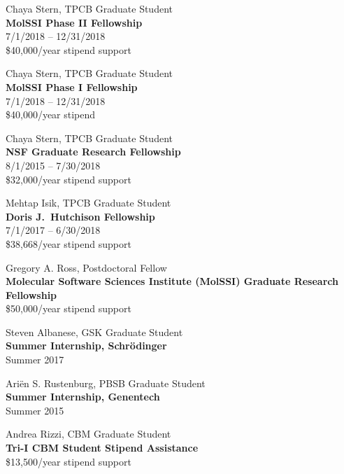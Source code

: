 \documentclass[10pt]{article}
\begin{document}
Chaya Stern, TPCB Graduate Student\\
{\bf MolSSI Phase II Fellowship}\\
7/1/2018 -- 12/31/2018\\
\$40,000/year stipend support

\vspace{1.5ex}

Chaya Stern, TPCB Graduate Student\\
{\bf MolSSI Phase I Fellowship}\\
7/1/2018 -- 12/31/2018\\
\$40,000/year stipend

\vspace{1.5ex}	

Chaya Stern, TPCB Graduate Student\\
{\bf NSF Graduate Research Fellowship}\\
8/1/2015 -- 7/30/2018\\
\$32,000/year stipend support

\vspace{1.5ex}

Mehtap Isik, TPCB Graduate Student\\
{\bf Doris J.~Hutchison Fellowship}\\
7/1/2017 -- 6/30/2018\\
\$38,668/year stipend support

\vspace{1.5ex}

Gregory A. Ross, Postdoctoral Fellow\\
{\bf Molecular Software Sciences Institute (MolSSI) Graduate Research Fellowship}\\
\$50,000/year stipend support

\vspace{1.5ex}

Steven Albanese, GSK Graduate Student\\
{\bf Summer Internship, Schr\"{o}dinger}\\
Summer 2017

\vspace{1.5ex}

Ari\"{e}n S. Rustenburg, PBSB Graduate Student\\
{\bf Summer Internship, Genentech}\\
Summer 2015

\vspace{1.5ex}

Andrea Rizzi, CBM Graduate Student\\
{\bf Tri-I CBM Student Stipend Assistance}\\
\$13,500/year stipend support
\end{document}
